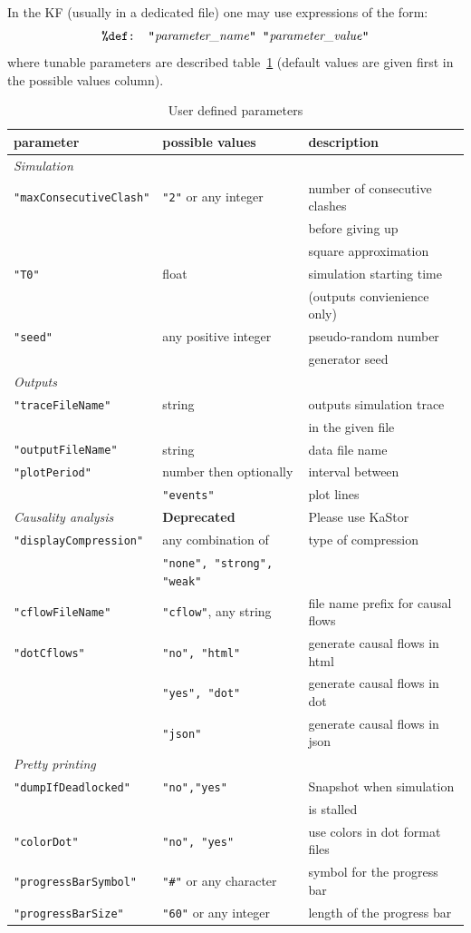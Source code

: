 \documentclass[11pt]{book}
\def\ttt#1{\texttt{#1}}
\begin{document}
In the KF (usually in a dedicated file) one may use expressions of the form:
\[
\hbox{\ttt{\%def: "}\textit{parameter\_name}\ttt{" "}\textit{parameter\_value}\ttt{"}}
\]
where tunable parameters are described table~\ref{tab:parameters} (default values are given first in the possible values column).
\begin{table}[ht]
\caption{User defined parameters}
\begin{tabular}{l|l|l}
parameter & possible values & description \\
\hline
\textit{Simulation} & &\\
\ttt{"maxConsecutiveClash"} & \ttt{"2"} or any integer & \small number of consecutive clashes \\
&& \small before giving up \\
&& \small square approximation\\
\ttt{"T0"} & float & \small simulation starting time\\
&& \small (outputs convienience only)\\
\ttt{"seed"} & any positive integer & \small pseudo-random number\\
&& \small generator seed\\ \hline
\textit{Outputs}&&\\
\ttt{"traceFileName"} & string & \small outputs simulation trace\\
&&\small in the given file\\
\ttt{"outputFileName"} & string & \small data file name\\
\ttt{"plotPeriod"} & number then optionally& \small interval between\\
& \ttt{"events"} & plot lines\\
\textit{Causality analysis}&\textbf{Deprecated}&Please use KaStor\\
\ttt{"displayCompression"} & any combination of & \small type of compression \\
&  \ttt{"none", "strong", "weak"} & \\
\ttt{"cflowFileName"} & \ttt{"cflow"}, any string & \small file name prefix for causal flows\\
\ttt{"dotCflows"} & \ttt{"no", "html"} & \small generate causal flows in html \\
& \ttt{"yes", "dot"} & \small generate causal flows in dot \\
& \ttt{"json"} & \small generate causal flows in json\\ \hline
\textit{Pretty printing}& &\\
\ttt{"dumpIfDeadlocked"} & \ttt{"no","yes"} & \small Snapshot when simulation \\&&\small is stalled\\
\ttt{"colorDot"} &  \ttt{"no", "yes"} & \small use colors in dot format files\\
\ttt{"progressBarSymbol"} & \ttt{"\#"} or any character & \small symbol for the progress bar\\
\ttt{"progressBarSize"} & \ttt{"60"} or any integer & \small length of the progress bar\\
\end{tabular}
\label{tab:parameters}
\end{table}
\end{document}
